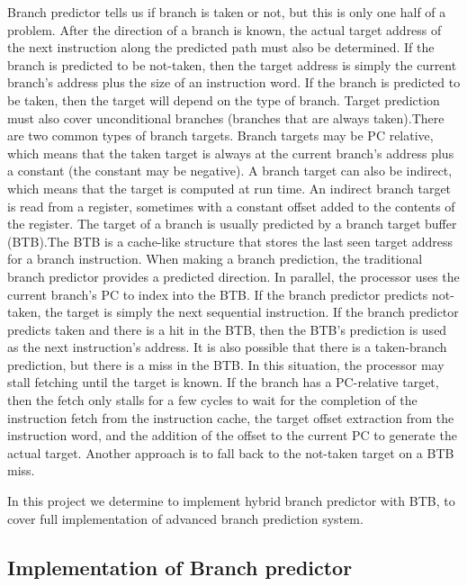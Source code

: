 \documentclass{scrreprt}
\begin{document}
Branch predictor tells us if branch is taken or not, but this is only one half of a problem. After the direction of a branch is known, the actual target address of the next instruction along the predicted path must also be determined. If the branch is predicted to be not-taken, then the target address is simply the current branch’s address plus the size of an instruction word. If the branch is predicted to be taken, then the target will depend on the type of branch. Target prediction must also cover unconditional branches (branches that are always taken).There are two common types of branch targets. Branch targets may be PC relative, which means that the taken target is always at the current branch’s address plus a constant (the constant may be negative). A branch target can also be indirect, which means that the target is computed at run time. An indirect branch target is read from a register, sometimes with a constant offset added to the contents of the register. The target of a branch is usually predicted by a branch target buffer (BTB).The BTB is a cache-like structure that stores the last seen target address for a branch instruction. When making a branch prediction, the traditional branch predictor provides a predicted direction. In parallel, the processor uses the current branch’s PC to index into the BTB. If the branch predictor predicts not-taken, the target is simply the next sequential instruction. If the branch predictor predicts taken and there is a hit in the BTB, then the BTB’s prediction is used as the next instruction’s address. It is also possible that there is a taken-branch prediction, but there is a miss in the BTB. In this situation, the processor may stall fetching until the target is known. If the branch has a PC-relative target, then the fetch only stalls for a few cycles to wait for the completion of the instruction fetch from the instruction cache, the target offset extraction from the instruction word, and the addition of the offset to the current PC to generate the actual target. Another approach is to fall back to the not-taken target on a BTB miss.

In this project we determine to implement hybrid branch predictor with BTB, to cover full implementation of advanced branch prediction system. 

\subsection*{Implementation of Branch predictor}
\end{document}
